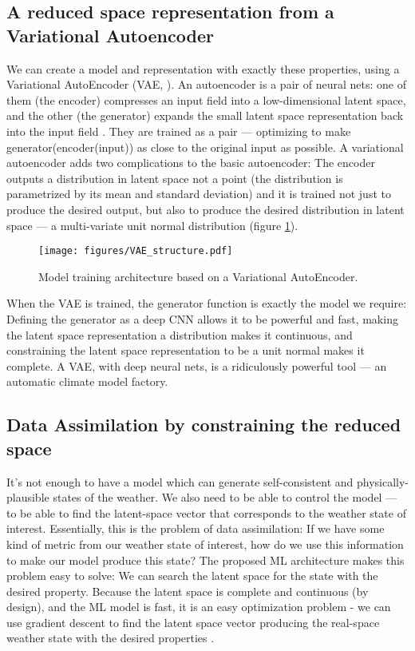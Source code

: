 \documentclass[gmd]{copernicus}
\begin{document}
    
\subsection{A reduced space representation from a Variational Autoencoder}

We can create a model and representation with exactly these properties, using a Variational AutoEncoder (VAE, \citet{VAE_Intro}). An autoencoder is a pair of neural nets: one of them (the encoder) compresses an input field into a low-dimensional latent space, and the other (the generator) expands the small latent space representation back into the input field \citep{Autoencoder}. They are trained as a pair --- optimizing to make generator(encoder(input)) as close to the original input as possible. A variational autoencoder adds two complications to the basic autoencoder: The encoder outputs a distribution in latent space not a point (the distribution is parametrized by its mean and standard deviation) and it is trained not just to produce the desired output, but also to produce the desired distribution in latent space  --- a multi-variate unit normal distribution (figure \ref{VAE_structure}).

\begin{figure}[h]
\texttt{[image: figures/VAE\_structure.pdf]}
\caption{Model training architecture based on a Variational AutoEncoder.}
\label{VAE_structure}
\end{figure}

When the VAE is trained, the generator function is exactly the model we require: Defining the generator as a deep CNN allows it to be powerful and fast, making the latent space representation a distribution makes it continuous, and constraining the latent space representation to be a unit normal makes it complete. A VAE, with deep neural nets, is a ridiculously powerful tool --- an automatic climate model factory.
     
\subsection{Data Assimilation by constraining the reduced space}
\label{section_DA}

It's not enough to have a model which can generate self-consistent and physically-plausible states of the weather. We also need to be able to control the model --- to be able to find the latent-space vector that corresponds to the weather state of interest. Essentially, this is the problem of data assimilation: If we have some kind of metric from our weather state of interest, how do we use this information to make our model produce this state?
The proposed ML architecture makes this problem easy to solve: We can search the latent space for the state with the desired property. Because the latent space is complete and continuous (by design), and the ML model is fast, it is an easy optimization problem - we can use gradient descent to find the latent space vector producing the real-space weather state with the desired properties \citep{MLDA}.
\end{document}
